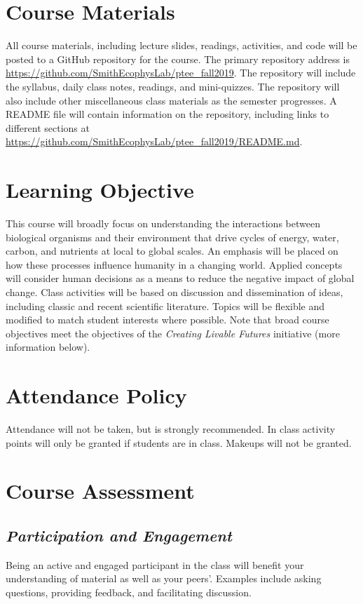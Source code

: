 \documentclass[12pt, notitlepage]{article}   	%
\begin{document}
{\section{Course Materials}
All course materials, including lecture slides, readings, activities, and code 
will be posted to a GitHub repository for the course.
The primary repository address is
\url{https://github.com/SmithEcophysLab/ptee_fall2019}.
The repository will include the syllabus, daily class notes, readings, and mini-quizzes.
The repository will also include other miscellaneous class materials as the semester
progresses. A README file will contain information on the repository, including
links to different sections at 
\url{https://github.com/SmithEcophysLab/ptee_fall2019/README.md}.

\section{Learning Objective}
This course will broadly focus on understanding the interactions between biological
organisms and their environment that drive cycles of energy, water, carbon, and nutrients
at local to global scales.
An emphasis will be placed on how these processes influence humanity in a changing world.
Applied concepts will consider human decisions as a means to reduce the negative impact
of global change. Class activities will be based on discussion and dissemination of ideas, 
including classic and recent scientific literature. 
Topics will be flexible and modified to match student interests where possible.
Note that broad course objectives meet the objectives of the \textit{Creating Livable Futures}
initiative (more information below).

\section{Attendance Policy}
Attendance will not be taken, but is strongly recommended. 
In class activity points will only be granted if students are in class.
Makeups will not be granted.

\section{Course Assessment}
\subsection{\textit{Participation and Engagement}}
Being an active and engaged participant in the class will benefit your understanding
of material as well as your peers'. Examples include asking questions, providing feedback,
and facilitating discussion.

}
\end{document}
